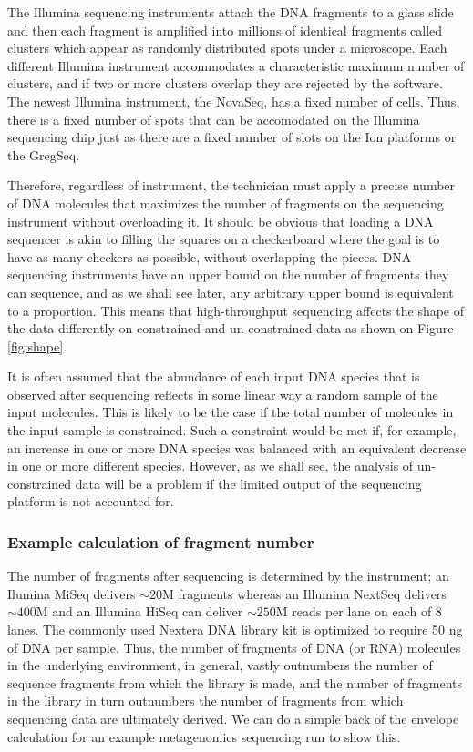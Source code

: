 \documentclass[
  onecolumn]{article}
\begin{document}
The Illumina sequencing instruments attach the DNA fragments to a glass slide and then each fragment is amplified into millions of identical fragments called clusters which appear as randomly distributed spots under a microscope. Each different Illumina instrument accommodates a characteristic maximum number of clusters, and if two or more clusters overlap they are rejected by the software. The newest Illumina instrument, the NovaSeq, has a fixed number of cells. Thus, there is a fixed number of spots that can be accomodated on the Illumina sequencing chip just as there are a fixed number of slots on the Ion platforms or the GregSeq.

Therefore, regardless of instrument, the technician must apply a precise number of DNA molecules that maximizes the number of fragments on the sequencing instrument without overloading it. It should be obvious that loading a DNA sequencer is akin to filling the squares on a checkerboard where the goal is to have as many checkers as possible, without overlapping the pieces. DNA sequencing instruments have an upper bound on the number of fragments they can sequence, and as we shall see later, any arbitrary upper bound is equivalent to a proportion. This means that high-throughput sequencing affects the shape of the data differently on constrained and un-constrained data as shown on Figure \ref{fig:shape}.

It is often assumed that the abundance of each input DNA species that is observed after sequencing reflects in some linear way a random sample of the input molecules. This is likely to be the case if the total number of molecules in the input sample is constrained. Such a constraint would be met if, for example, an increase in one or more DNA species was balanced with an equivalent decrease in one or more different species. However, as we shall see, the analysis of un-constrained data will be a problem if the limited output of the sequencing platform is not accounted for.

\hypertarget{example-calculation-of-fragment-number}{%
\subsubsection{Example calculation of fragment number}\label{example-calculation-of-fragment-number}}

The number of fragments after sequencing is determined by the instrument; an Ilumina MiSeq delivers \(\sim 20\)M fragments whereas an Illumina NextSeq delivers \(\sim 400\)M and an Illumina HiSeq can deliver \(\sim 250\)M reads per lane on each of 8 lanes. The commonly used Nextera DNA library kit is optimized to require 50 ng of DNA per sample. Thus, the number of fragments of DNA (or RNA) molecules in the underlying environment, in general, vastly outnumbers the number of sequence fragments from which the library is made, and the number of fragments in the library in turn outnumbers the number of fragments from which sequencing data are ultimately derived. We can do a simple back of the envelope calculation for an example metagenomics sequencing run to show this.
\end{document}
